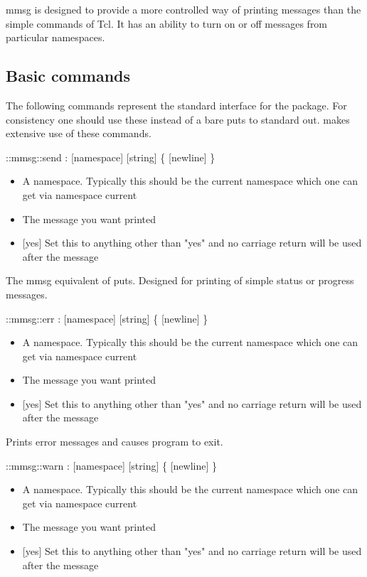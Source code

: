 mmsg is designed to provide a more controlled way of printing messages than the simple  commands of Tcl. It has an ability to turn on or off messages from particular namespaces.

\subsection{Basic commands}

 The following commands represent the standard interface for the  package. For consistency one should use these instead of a bare puts to standard out.  makes extensive use of these commands.

\begin{code}     
  ::mmsg::send : [namespace] [string] \{ [newline] \}
\end{code}
\begin{itemize}
          \item {} A namespace. Typically this should be the current namespace which one can get via namespace current
          \item {} The message you want printed
          \item {} [yes] Set this to anything other than "yes" and no carriage return will be used after the message
\end{itemize}
The mmsg equivalent of puts. Designed for printing of simple status or progress messages.
\begin{code} 
  ::mmsg::err : [namespace] [string] \{ [newline] \}
\end{code}
\begin{itemize}
          \item {} A namespace. Typically this should be the current namespace which one can get via namespace current
          \item {} The message you want printed
          \item {} [yes] Set this to anything other than "yes" and no carriage return will be used after the message
\end{itemize}
Prints error messages and causes program to exit.
\begin{code} 
  ::mmsg::warn : [namespace] [string] \{ [newline] \}
\end{code}
\begin{itemize}
          \item {} A namespace. Typically this should be the current namespace which one can get via namespace current
          \item {} The message you want printed
          \item {} [yes] Set this to anything other than "yes" and no carriage return will be used after the message
\end{itemize}
